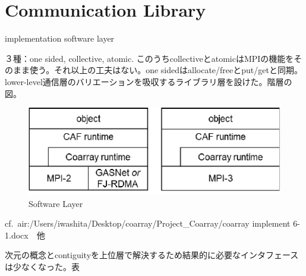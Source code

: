 \section{Communication Library}\label{sec:runtime}

implementation software layer

３種：one sided, collective, atomic. このうちcollectiveとatomicはMPIの機能をそのまま使う。それ以上の工夫はない。one sidedはallocate/freeとput/getと同期。lower-level通信層のバリエーションを吸収するライブラリ層を設けた。階層の図。

\begin{figure}[tbh]
  \begin{center}
  \includegraphics[scale=1.0]{figs/layer.pdf}
  \caption{Software Layer}\label{fig:layer}
  \end{center}
\end{figure}

cf.\ air:/Users/iwashita/Desktop/coarray/Project\_Coarray/coarray implement 6-1.docx　他



次元の概念とcontiguityを上位層で解決するため結果的に必要なインタフェースは少なくなった。表

